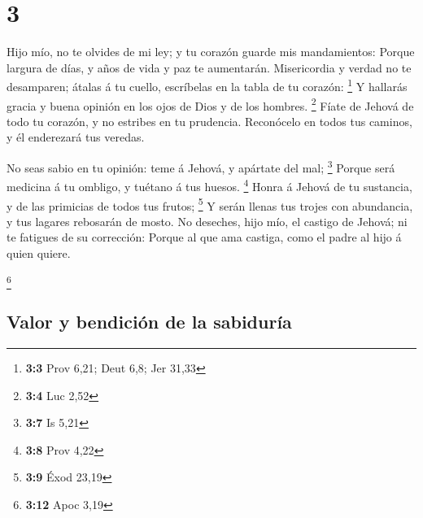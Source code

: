 \hypertarget{section-2}{%
\section{3}\label{section-2}}

 Hijo mío, no te olvides de mi ley; y tu corazón guarde
mis mandamientos:  Porque largura de días, y años de vida
y paz te aumentarán.  Misericordia y verdad no te
desamparen; átalas á tu cuello, escríbelas en la tabla de tu corazón:
\footnote{\textbf{3:3} Prov 6,21; Deut 6,8; Jer 31,33}  Y
hallarás gracia y buena opinión en los ojos de Dios y de los hombres.
\footnote{\textbf{3:4} Luc 2,52}  Fíate de Jehová de todo
tu corazón, y no estribes en tu prudencia.  Reconócelo en
todos tus caminos, y él enderezará tus veredas.

 No seas sabio en tu opinión: teme á Jehová, y apártate
del mal; \footnote{\textbf{3:7} Is 5,21}  Porque será
medicina á tu ombligo, y tuétano á tus huesos. \footnote{\textbf{3:8}
  Prov 4,22}  Honra á Jehová de tu sustancia, y de las
primicias de todos tus frutos; \footnote{\textbf{3:9} Éxod 23,19}
 Y serán llenas tus trojes con abundancia, y tus lagares
rebosarán de mosto.  No deseches, hijo mío, el castigo de
Jehová; ni te fatigues de su corrección:  Porque al que
ama castiga, como el padre al hijo á quien quiere.

\footnote{\textbf{3:12} Apoc 3,19}

\hypertarget{valor-y-bendiciuxf3n-de-la-sabiduruxeda}{%
\subsection{Valor y bendición de la
sabiduría}\label{valor-y-bendiciuxf3n-de-la-sabiduruxeda}}

